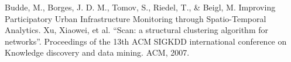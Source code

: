\documentclass{article}
\begin{document}
	\begin{thebibliography}{9}
			Budde, M., Borges, J. D. M., Tomov, S., Riedel, T., \& Beigl, M. Improving Participatory Urban Infrastructure Monitoring through Spatio-Temporal Analytics.
			Xu, Xiaowei, et al. ``Scan: a structural clustering algorithm for networks''. Proceedings of the 13th ACM SIGKDD international conference on Knowledge discovery and data mining. ACM, 2007.
	\end{thebibliography}
\end{document}
